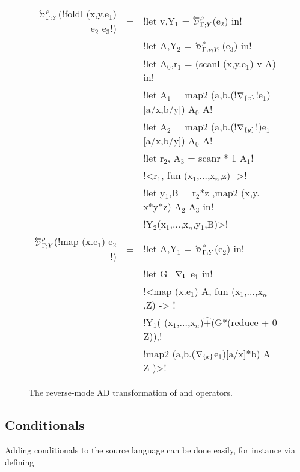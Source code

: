 \begin{figure}
\begin{center}
\begin{tabular}{|r c l|}
\hline
    $\directD{\rho}{\Gamma}{Y}$(!foldl (x,y.e$_1$) e$_2$ e$_3$!) &=&
            !let v,Y$_1$ = $\directD{\rho}{\Gamma}{Y}$(e$_2$) in! \\
            && !let A,Y$_2$ = $\directD{\rho}{\Gamma,v}{Y_1}$(e$_3$) in! \\
            && !let A$_0$,r$_1$ = (scanl (x,y.e$_1$) v A) in! \\
            && !let A$_1$ = map2 (a,b.(!$\nabla_{\{x\}}$!e$_1$)[a/x,b/y]) A$_0$ A! \\
            && !let A$_2$ = map2 (a,b.(!$\nabla_{\{y\}}$!)e$_1$[a/x,b/y]) A$_0$ A! \\
            && !let r$_2$, A$_3$ = scanr * 1 A$_1$! \\
            && !<r$_1$, fun (x$_1$,$\ldots$,x$_n$,z) ->! \\
            && !let y$_1$,B = r$_2$*z ,map2 (x,y. x*y*z) A$_2$ A$_3$ in! \\
            && !Y$_2$(x$_1$,$\ldots$,x$_n$,y$_1$,B)>! \\
    $\directD{\rho}{\Gamma}{Y}$(!map (x.e$_{1}$) e$_{2}$!) &=&  
            !let A,Y$_{1}$ = $\directD{\rho}{\Gamma}{Y}$(e$_{2}$) in! \\
            && !let G=$\nabla_{\Gamma}$ e$_{1}$ in!\\
            && !<map (x.e$_{1}$) A, fun (x$_{1}$,$\ldots$,x$_n$,Z) -> !\\
            && !Y$_{1}$( (x$_{1}$,$\ldots$,x$_n$)$\widehat{+}$(G*(reduce + 0 Z)),!\\
            && \quad\quad !map2 (a,b.($\nabla_{\{x\}}$e$_{1}$)[a/x]*b) A Z )>!\\\hline
\end{tabular}
\end{center}
\caption{The reverse-mode AD transformation of  and  operators.}
\label{fig:foldl_map_trans}
\end{figure}

\subsection{Conditionals} %
\label{sub:lift_conditional}

Adding conditionals to the source language can be done easily, for instance via defining


